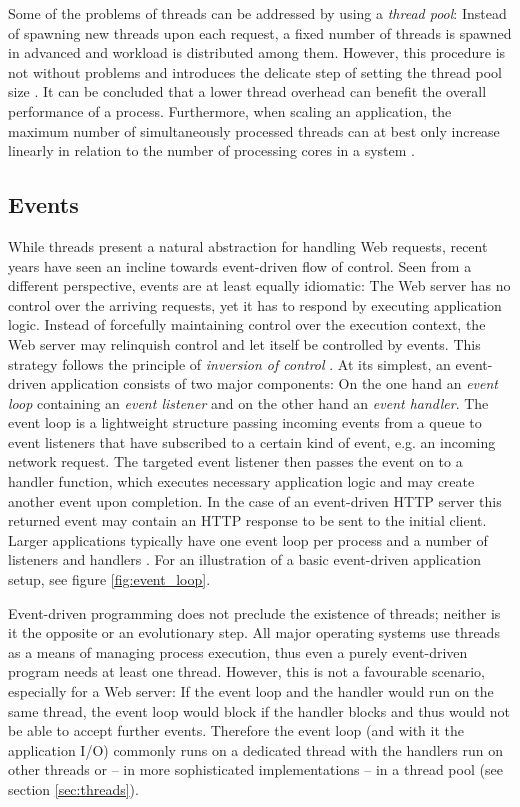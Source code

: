 Some of the problems of threads can be addressed by using a \textit{thread pool}: Instead of spawning new threads upon each request, a fixed number of threads is spawned in advanced and workload is distributed among them. However, this procedure is not without problems and introduces the delicate step of setting the thread pool size \cite{threadpools}. It can be concluded that a lower thread overhead can benefit the overall performance of a process. Furthermore, when scaling an application, the maximum number of simultaneously processed threads can at best only increase linearly in relation to the number of processing cores in a system \cite{McCool}.

\subsection{Events}
While threads present a natural abstraction for handling Web requests, recent years have seen an incline towards event-driven flow of control. Seen from a different perspective, events are at least equally idiomatic: The Web server has no control over the arriving requests, yet it has to respond by executing application logic. Instead of forcefully maintaining control over the execution context, the Web server may relinquish control and let itself be controlled by events. This strategy follows the principle of \textit{inversion of control} \cite{Hohpe2006}. At its simplest, an event-driven application consists of two major components: On the one hand an \textit{event loop} containing an \textit{event listener} and on the other hand an \textit{event handler}. The event loop is a lightweight structure passing incoming events from a queue to event listeners that have subscribed to a certain kind of event, e.g. an incoming network request. The targeted event listener then passes the event on to a handler function, which executes necessary application logic and may create another event upon completion. In the case of an event-driven HTTP server this returned event may contain an HTTP response to be sent to the initial client. Larger applications typically have one event loop per process and a number of listeners and handlers \cite[p. 33]{Hughes-Croucher2012}. For an illustration of a basic event-driven application setup, see figure \ref{fig:event_loop}.

Event-driven programming does not preclude the existence of threads; neither is it the opposite or an evolutionary step. All major operating systems use threads as a means of managing process execution, thus even a purely event-driven program needs at least one thread. However, this is not a favourable scenario, especially for a Web server: If the event loop and the handler would run on the same thread, the event loop would block if the handler blocks and thus would not be able to accept further events. Therefore the event loop (and with it the application I/O) commonly runs on a dedicated thread with the handlers run on other threads or -- in more sophisticated implementations -- in a thread pool (see section \ref{sec:threads}). 

